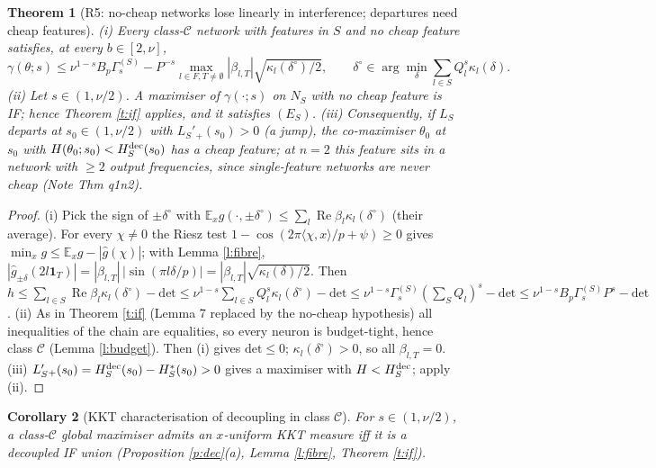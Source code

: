 \documentclass[11pt]{article}
\newtheorem{theorem}{Theorem}\newtheorem{lemma}[theorem]{Lemma}\newtheorem{proposition}[theorem]{Proposition}
\newtheorem{corollary}[theorem]{Corollary}
\theoremstyle{remark}\newtheorem{remark}[theorem]{Remark}
\newcommand{\E}{\mathbb E}\newcommand{\R}{\mathbb R}\newcommand{\Re}{\operatorname{Re}}
\begin{document}
\begin{theorem}[R5: no-cheap networks lose linearly in interference; departures need cheap features]\label{t:cheap}
(i) Every class-$\mathcal C$ network with features in $S$ and no cheap feature satisfies, at every $b\in[2,\nu]$,
\[\gamma(\theta;s)\le\nu^{1-s}B_p\Gamma^{(S)}_s-P^{-s}\max_{l\in F,T\ne\emptyset}|\beta_{l,T}|\sqrt{\kappa_l(\delta^\circ)/2},\qquad
\delta^\circ\in\arg\min_\delta\textstyle\sum_{l\in S}Q_l^s\kappa_l(\delta).\]
(ii) Let $s\in(1,\nu/2)$. A maximiser of $\gamma(\cdot;s)$ on $N_S$ with no cheap feature is IF; hence Theorem \ref{t:if} applies, and it satisfies $(E_S)$.
(iii) Consequently, if $L_S$ departs at $s_0\in(1,\nu/2)$ with $L_S'{}_+(s_0)>0$ (a jump), the co-maximiser $\theta_0$ at $s_0$ with $H(\theta_0;s_0)<H^{\rm dec}_S(s_0)$ has a cheap feature;
at $n=2$ this feature sits in a network with $\ge2$ output frequencies, since single-feature networks are never cheap (Note Thm q1n2).
\end{theorem}
\begin{proof}
(i) Pick the sign of $\pm\delta^\circ$ with $\E_xg(\cdot,\pm\delta^\circ)\le\sum_l\Re\beta_l\kappa_l(\delta^\circ)$ (their average). For every $\chi\ne0$ the Riesz test
$1-\cos(2\pi\langle\chi,x\rangle/p+\psi)\ge0$ gives $\min_xg\le\E_xg-|\hat g(\chi)|$; with Lemma \ref{l:fibre}, $|\hat g_{\pm\delta}(2l\mathbf1_T)|=|\beta_{l,T}|\,|\sin(\pi l\delta/p)|=|\beta_{l,T}|\sqrt{\kappa_l(\delta)/2}$.
Then $h\le\sum_{l\in S}\Re\beta_l\kappa_l(\delta^\circ)-\mathrm{det}\le\nu^{1-s}\sum_{l\in S}Q_l^s\kappa_l(\delta^\circ)-\mathrm{det}\le\nu^{1-s}\Gamma^{(S)}_s(\sum_SQ_l)^s-\mathrm{det}
\le\nu^{1-s}B_p\Gamma^{(S)}_sP^s-\mathrm{det}$.
(ii) As in Theorem \ref{t:if} (Lemma 7 replaced by the no-cheap hypothesis) all inequalities of the chain are equalities, so every neuron is budget-tight, hence
class $\mathcal C$ (Lemma \ref{l:budget}). Then (i) gives $\mathrm{det}\le0$; $\kappa_l(\delta^\circ)>0$, so all $\beta_{l,T}=0$.
(iii) $L_S'{}_+(s_0)=H^{\rm dec}_S(s_0)-H^*_S(s_0)>0$ gives a maximiser with $H<H^{\rm dec}_S$; apply (ii).
\end{proof}
\begin{corollary}[KKT characterisation of decoupling in class $\mathcal C$]
For $s\in(1,\nu/2)$, a class-$\mathcal C$ global maximiser admits an $x$-uniform KKT measure iff it is a decoupled IF union (Proposition \ref{p:dec}(a), Lemma \ref{l:fibre}, Theorem \ref{t:if}).
\end{corollary}
\end{document}
